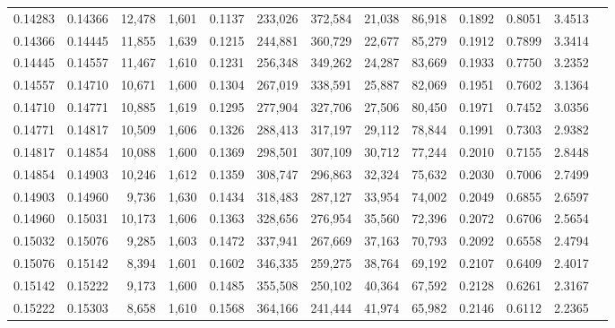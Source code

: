 \begin{tabular}{rrrrrrrrrrrrr}
0.14283 & 0.14366 & 12,478 & 1,601 &                                     0.1137 & 233,026 & 372,584 &  21,038 &  86,918 & 0.1892 & 0.8051 & 3.4513 \\
0.14366 & 0.14445 & 11,855 & 1,639 &                                     0.1215 & 244,881 & 360,729 &  22,677 &  85,279 & 0.1912 & 0.7899 & 3.3414 \\
0.14445 & 0.14557 & 11,467 & 1,610 &                                     0.1231 & 256,348 & 349,262 &  24,287 &  83,669 & 0.1933 & 0.7750 & 3.2352 \\
0.14557 & 0.14710 & 10,671 & 1,600 &                                     0.1304 & 267,019 & 338,591 &  25,887 &  82,069 & 0.1951 & 0.7602 & 3.1364 \\
0.14710 & 0.14771 & 10,885 & 1,619 &                                     0.1295 & 277,904 & 327,706 &  27,506 &  80,450 & 0.1971 & 0.7452 & 3.0356 \\
0.14771 & 0.14817 & 10,509 & 1,606 &                                     0.1326 & 288,413 & 317,197 &  29,112 &  78,844 & 0.1991 & 0.7303 & 2.9382 \\
0.14817 & 0.14854 & 10,088 & 1,600 &                                     0.1369 & 298,501 & 307,109 &  30,712 &  77,244 & 0.2010 & 0.7155 & 2.8448 \\
0.14854 & 0.14903 & 10,246 & 1,612 &                                     0.1359 & 308,747 & 296,863 &  32,324 &  75,632 & 0.2030 & 0.7006 & 2.7499 \\
0.14903 & 0.14960 &  9,736 & 1,630 &                                     0.1434 & 318,483 & 287,127 &  33,954 &  74,002 & 0.2049 & 0.6855 & 2.6597 \\
0.14960 & 0.15031 & 10,173 & 1,606 &                                     0.1363 & 328,656 & 276,954 &  35,560 &  72,396 & 0.2072 & 0.6706 & 2.5654 \\
0.15032 & 0.15076 &  9,285 & 1,603 &                                     0.1472 & 337,941 & 267,669 &  37,163 &  70,793 & 0.2092 & 0.6558 & 2.4794 \\
0.15076 & 0.15142 &  8,394 & 1,601 &                                     0.1602 & 346,335 & 259,275 &  38,764 &  69,192 & 0.2107 & 0.6409 & 2.4017 \\
0.15142 & 0.15222 &  9,173 & 1,600 &                                     0.1485 & 355,508 & 250,102 &  40,364 &  67,592 & 0.2128 & 0.6261 & 2.3167 \\
0.15222 & 0.15303 &  8,658 & 1,610 &                                     0.1568 & 364,166 & 241,444 &  41,974 &  65,982 & 0.2146 & 0.6112 & 2.2365 \\

\end{tabular}

